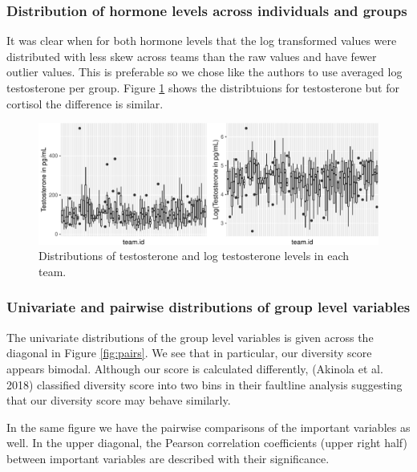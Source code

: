 \documentclass[]{article}
\begin{document}
\hypertarget{distribution-of-hormone-levels-across-individuals-and-groups}{%
\subsubsection{Distribution of hormone levels across individuals and
groups}\label{distribution-of-hormone-levels-across-individuals-and-groups}}

It was clear when for both hormone levels that the log transformed
values were distributed with less skew across teams than the raw values
and have fewer outlier values. This is preferable so we chose like the
authors to use averaged log testosterone per group. Figure
\ref{fig:test} shows the distribtuions for testosterone but for cortisol
the difference is similar.

\begin{figure}
\centering
\includegraphics{19_10_02_hw5_q1_files/figure-latex/test-1.pdf}
\caption{\label{fig:test}Distributions of testosterone and log
testosterone levels in each team.}
\end{figure}

\hypertarget{univariate-and-pairwise-distributions-of-group-level-variables}{%
\subsubsection{Univariate and pairwise distributions of group level
variables}\label{univariate-and-pairwise-distributions-of-group-level-variables}}

The univariate distributions of the group level variables is given
across the diagonal in Figure \ref{fig:pairs}. We see that in
particular, our diversity score appears bimodal. Although our score is
calculated differently, (Akinola et al. 2018) classified diversity score
into two bins in their faultline analysis suggesting that our diversity
score may behave similarly.

In the same figure we have the pairwise comparisons of the important
variables as well. In the upper diagonal, the Pearson correlation
coefficients (upper right half) between important variables are
described with their significance.
\end{document}
